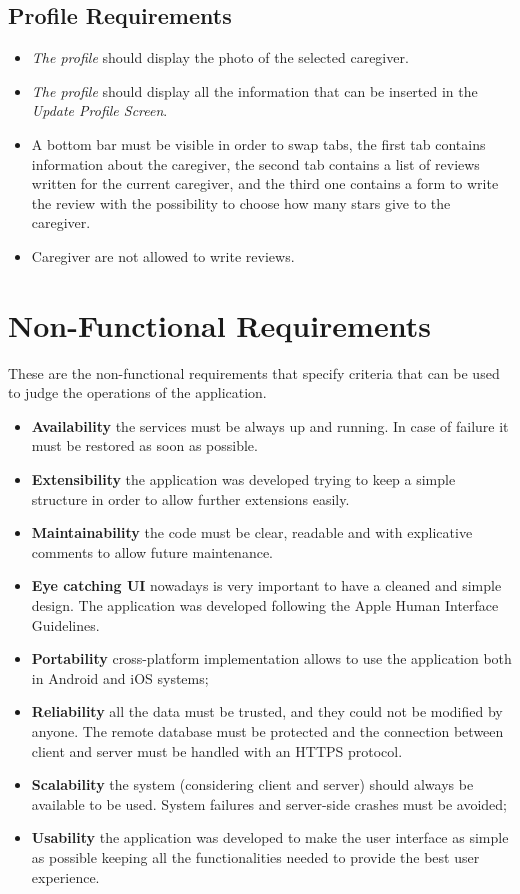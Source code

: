 \documentclass[../../dd.tex]{subfiles}
\begin{document}
    \subsection{Profile Requirements}
    \begin{itemize}
        \item \textit{The profile} should display the photo of the selected caregiver.
        \item \textit{The profile} should display all the information that can be inserted in the \textit{Update Profile Screen}.
        \item A bottom bar must be visible in order to swap tabs, the first tab contains information about the caregiver, the second tab
        contains a list of reviews written for the current caregiver, and the third one contains a form to write the review with the possibility
        to choose how many stars give to the caregiver.
        \item Caregiver are not allowed to write reviews.
    \end{itemize}

\section{Non-Functional Requirements}
These are the non-functional requirements that specify criteria that can be
used to judge the operations of the application.
    \begin{itemize}
        \item \textbf{Availability} the services must be always up and running.
        In case of failure it must be restored as soon as possible.
        \item \textbf{Extensibility} the application was developed trying to keep a simple
        structure in order to allow further extensions easily.
        \item \textbf{Maintainability} the code must be clear, readable and with explicative
        comments to allow future maintenance.
        \item \textbf{Eye catching UI} nowadays is very important to have a cleaned
        and simple design.
        The application was developed following the Apple
        Human Interface Guidelines.
        \item \textbf{Portability} cross-platform implementation allows to use the application both in Android and iOS systems;
        \item \textbf{Reliability} all the data must be trusted, and they could not be modified
        by anyone.
        The remote database must be protected and the connection
        between client and server must be handled with an HTTPS protocol.
        \item \textbf{Scalability} the system (considering client and server) should always
        be available to be used.
        System failures and server-side crashes must be avoided;
        \item \textbf{Usability} the application was developed to make the user interface as
        simple as possible keeping all the functionalities needed to provide the
        best user experience.

    \end{itemize}
\end{document}

